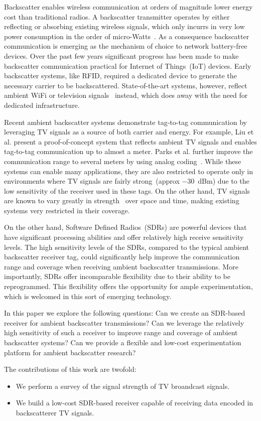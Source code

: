 Backscatter enables wireless communication at orders of magnitude lower
energy cost than traditional radios. A backscatter transmitter operates
by either reflecting or absorbing existing wireless signals, which only
incurrs in very low power consumption in the order of
micro-Watts~\cite{liu_ambient_2013}. As a consequence backscatter
communication is emerging as the mechanism of choice to network
battery-free devices.  Over the past few years significant progress has
been made to make backscatter communication practical for Internet of
Things~(IoT) devices. Early backscatter systems, like RFID, required a
dedicated device to generate the necessary carrier to be backscattered.
State-of-the-art systems, however, reflect ambient WiFi or television
signals~\cite{liu_ambient_2013} instead, which does away with the need for
dedicated infrastructure. 

Recent ambient backscatter systems demonstrate tag-to-tag communication
by leveraging TV signals as a source of both carrier and energy. For
example, Liu et al. present a proof-of-concept system that reflects
ambient TV signals and enables tag-to-tag communication up to almost a
meter. Parks et al. further improve the communication range to several
meters by using analog coding~\cite{parks_turbocharging_2014}. While
these systems can enable many applications, they are also restricted to
operate only in environments where TV signals are fairly strong~(approx
\SI{-30}{dBm}) due to the low sensitivity of the receiver used in these
tags. On the other hand, TV signals are known to vary greatly in
strength~\cite{wang_fm_2017} over space and time, making existing
systems very restricted in their coverage.

On the other hand, Software Defined Radios~(SDRs) are powerful devices
that have significant processing abilities and offer relatively high
receive sensitivity levels. The high sensitivity levels of the SDRs,
compared to the typical ambient backscatter receiver tag, could
significantly help improve the communication range and coverage when
receiving ambient backscatter transmissions. More importantly, SDRs
offer incomparable flexibility due to their ability to be reprogrammed.
This flexibility offers the opportunity for ample experimentation, which
is welcomed in this sort of emerging technology.

In this paper we explore the following questions: Can we create an
SDR-based receiver for ambient backscatter transmissions? Can we
leverage the relatively high sensitivity of such a receiver to improve
range and coverage of ambient backscatter systems? Can we provide a
flexible and low-cost experimentation platform for ambient backscatter
research?

 The contributions of this work are twofold:
\begin{itemize}
				\item We perform a survey of the signal strength of TV
								broandcast signals.

				\item We build a low-cost SDR-based receiver capable of
								receiving data encoded in backscatterer TV signals.
\end{itemize}

